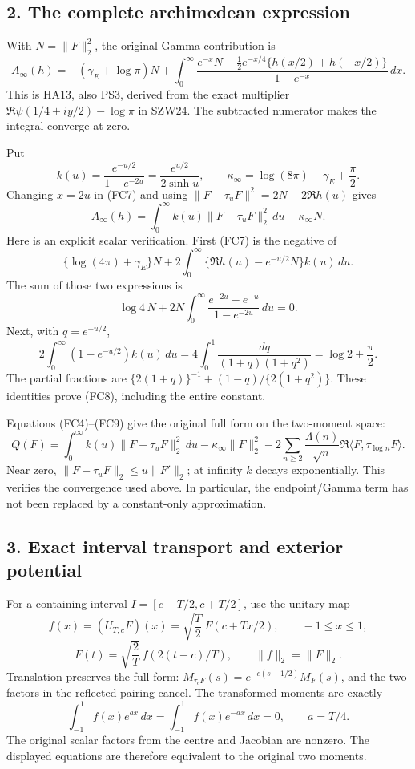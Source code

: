 \documentclass[
  10pt,
  a4paper,
]{article}
\begin{document}
\subsection{2. The complete archimedean
expression}\label{the-complete-archimedean-expression}

With \(N=\|F\|_2^2\), the original Gamma contribution is \[
A_\infty(h)=-(\gamma_E+\log\pi)N+
\int_0^\infty
\frac{e^{-x}N-\tfrac12e^{-x/4}\{h(x/2)+h(-x/2)\}}
{1-e^{-x}}\,dx.
\tag{FC7}
\] This is HA13, also PS3, derived from the exact multiplier
\(\Re\psi(1/4+iy/2)-\log\pi\) in SZW24. The subtracted numerator makes
the integral converge at zero.

Put \[
k(u)=\frac{e^{-u/2}}{1-e^{-2u}}=\frac{e^{u/2}}{2\sinh u},
\qquad
\kappa_\infty=\log(8\pi)+\gamma_E+\frac\pi2.
\] Changing \(x=2u\) in (FC7) and using \(\|F-\tau_uF\|^2=2N-2\Re h(u)\)
gives \[
A_\infty(h)=
\int_0^\infty k(u)\|F-\tau_uF\|_2^2\,du-\kappa_\infty N.
\tag{FC8}
\] Here is an explicit scalar verification. First (FC7) is the negative
of \[
\{\log(4\pi)+\gamma_E\}N+
2\int_0^\infty\{\Re h(u)-e^{-u/2}N\}k(u)\,du.
\] The sum of those two expressions is \[
\log4\,N+
2N\int_0^\infty
\frac{e^{-2u}-e^{-u}}{1-e^{-2u}}\,du=0.
\] Next, with \(q=e^{-u/2}\), \[
2\int_0^\infty(1-e^{-u/2})k(u)\,du
=4\int_0^1\frac{dq}{(1+q)(1+q^2)}
=\log2+\frac\pi2.
\tag{FC9}
\] The partial fractions are \(\{2(1+q)\}^{-1}+(1-q)/\{2(1+q^2)\}\).
These identities prove (FC8), including the entire constant.

Equations (FC4)--(FC9) give the original full form on the two-moment
space: \[
Q(F)=\int_0^\infty k(u)\|F-\tau_uF\|_2^2\,du
-\kappa_\infty\|F\|_2^2
-2\sum_{n\ge2}\frac{\Lambda(n)}{\sqrt n}
\Re\langle F,\tau_{\log n}F\rangle.
\tag{FC10}
\] Near zero, \(\|F-\tau_uF\|_2\le u\|F'\|_2\); at infinity \(k\) decays
exponentially. This verifies the convergence used above. In particular,
the endpoint/Gamma term has not been replaced by a constant-only
approximation.

\subsection{3. Exact interval transport and exterior
potential}\label{exact-interval-transport-and-exterior-potential}

For a containing interval \(I=[c-T/2,c+T/2]\), use the unitary map \[
f(x)=(U_{T,c}F)(x)=\sqrt{\frac T2}\,F(c+Tx/2),
\qquad -1\le x\le1,
\] \[
F(t)=\sqrt{\frac2T}\,f(2(t-c)/T),\qquad
\|f\|_2=\|F\|_2.
\tag{FC11}
\] Translation preserves the full form:
\(M_{\tau_cF}(s)=e^{-c(s-1/2)}M_F(s)\), and the two factors in the
reflected pairing cancel. The transformed moments are exactly \[
\int_{-1}^1f(x)e^{ax}\,dx=
\int_{-1}^1f(x)e^{-ax}\,dx=0,\qquad a=T/4.
\tag{FC12}
\] The original scalar factors from the centre and Jacobian are nonzero.
The displayed equations are therefore equivalent to the original two
moments.
\end{document}
